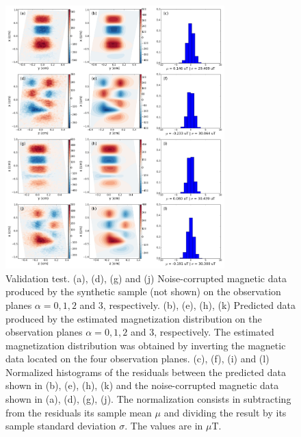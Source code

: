 \documentclass[draft,gc]{agutex}
\begin{document}
 \begin{figure}
 \noindent \includegraphics[width=20pc]{Figs/Fig5_LQ.png}
 \caption{Validation test. (a), (d), (g) and (j) Noise-corrupted
 magnetic data produced by the synthetic sample (not shown) on the
 observation planes $\alpha = 0, 1, 2$ and $3$, respectively.
 (b), (e), (h), (k) Predicted data produced by the estimated
 magnetization distribution on the
 observation planes $\alpha = 0, 1, 2$ and $3$, respectively.
 The estimated magnetization distribution was obtained by
 inverting the magnetic data located on the four observation
 planes.
 (c), (f), (i) and (l) Normalized histograms of the residuals between the
 predicted data shown in (b), (e), (h), (k) and the 
 noise-corrupted magnetic data shown in (a), (d), (g), (j). 
 The normalization
 consists in subtracting from the residuals its sample mean $\mu$ 
 and dividing the result by its sample standard deviation $\sigma$.
 The values are in $\mu$T.}
 \label{fig:datafit-validation}
 \end{figure}
 
\end{document}
